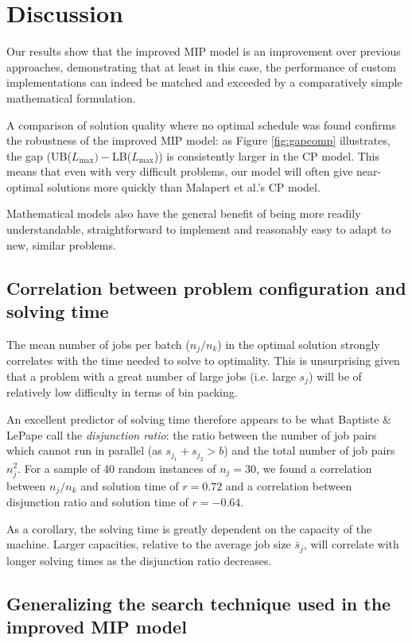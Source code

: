 \documentclass[oribibl]{llncs}
\def\Lmax{{L_{\mathrm{max}}}}
\begin{document}
\section{Discussion}
\label{sec:discussion}
Our results show that the improved MIP model is an improvement over previous
approaches, demonstrating that at least in this case, the performance
of custom implementations can indeed be matched and exceeded by
a comparatively simple mathematical formulation.

A comparison of solution quality where no optimal schedule was
found confirms the robustness of the improved MIP model: as Figure
\ref{fig:gapcomp} illustrates, the gap (UB($\Lmax)-$LB($\Lmax$)) is
consistently larger in the CP model. This means that even with very difficult
problems, our model will often give near-optimal solutions more quickly
than Malapert et al.'s CP model.

Mathematical models also have the general benefit of being more readily
understandable, straightforward to implement and reasonably easy to
adapt to new, similar problems.

\subsection{Correlation between problem configuration and solving time}
\label{sec:correlation}
The mean number of jobs per batch ($n_j/n_k$) in the optimal solution
strongly correlates with the time needed to solve to optimality. This
is unsurprising given that a problem with a great number of large jobs
(i.e. large $s_j$) will be of relatively low difficulty in terms of bin
packing. 

An excellent predictor of solving time therefore appears to be what Baptiste \& LePape
\cite{baptistelepape} call the \textit{disjunction ratio}: the ratio between the
number of job pairs which cannot run in parallel (as $s_{j_1} + s_{j_2} > b$) and
the total number of job pairs $n_j^2$. For a sample of 40 random instances of
$n_j=30$, we found a correlation between $n_j/n_k$ and solution time of $r =
0.72$ and a correlation between disjunction ratio and solution time of $r =
-0.64$.

As a corollary, the solving time is greatly dependent on the
capacity of the machine. Larger capacities, relative to the average job size
$\bar{s}_j$, will correlate with longer solving times as the disjunction ratio decreases.

\subsection{Generalizing the search technique used in the improved MIP model}
\end{document}
